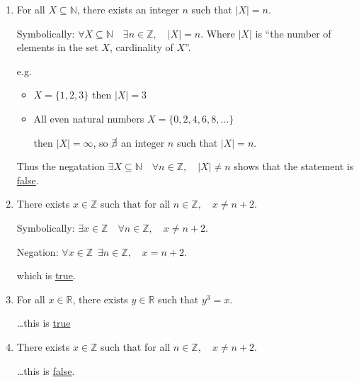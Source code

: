 \documentclass[../main.tex]{subfiles}
\begin{document}
\begin{enumerate}
    \item For all $X \subseteq \mathbb{N}$, there exists an integer $n$ such that $|X| = n$.

    Symbolically: $\forall X \subseteq \mathbb{N}\quad \exists n \in \mathbb{Z},\quad |X| = n$. Where $|X|$
    is ``the number of elements in the set $X$, cardinality of $X$''.

    e.g.
    \begin{itemize}
        \item $X = \{1, 2, 3\}$ then $|X| = 3$
        \item All even natural numbers $X = \{0, 2, 4, 6, 8, \dots\}$
        
        then $|X| = \infty$,
        so $\cancel{\exists}$ an integer $n$ such that $|X| = n$.
    \end{itemize}

    Thus the negatation
    $\exists X \subseteq \mathbb{N}\quad \forall n \in \mathbb{Z},\quad |X| \neq n$
    shows that the statement is \underline{false}.
    \item There exists $x \in \mathbb{Z}$ such that for all $n \in \mathbb{Z},\quad x \neq n + 2$.
    
    Symbolically: $\exists x \in \mathbb{Z}\quad \forall n \in \mathbb{Z},\quad x \neq n + 2$.

    Negation: $\forall x \in \mathbb{Z}\enspace \exists n \in \mathbb{Z},\quad x = n + 2$.

    which is \underline{true}.
    \item For all $x \in \mathbb{R}$, there exists $y \in \mathbb{R}$ such that $y^3 = x$.
    
    \dots this is \underline{true}
    \item There exists $x \in \mathbb{Z}$ such that for all $n \in \mathbb{Z},\quad x \neq n + 2$.
    
    \dots this is \underline{false}.
\end{enumerate}


\newpage
{}
\end{document}
